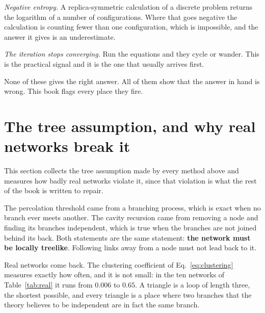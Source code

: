 \emph{Negative entropy.} A replica-symmetric calculation of a discrete problem
returns the logarithm of a number of configurations. Where that goes negative
the calculation is counting fewer than one configuration, which is impossible,
and the answer it gives is an underestimate.

\emph{The iteration stops converging.} Run the equations and they cycle or
wander. This is the practical signal and it is the one that usually arrives
first.

None of these gives the right answer. All of them show that the answer in hand
is wrong. This book flags every place they fire.

\section{The tree assumption, and why real networks break it}
\label{sec:treebreaks}

This section collects the tree assumption made by every method above and
measures how badly real networks violate it, since that violation is what the
rest of the book is written to repair.

The percolation threshold came from a
branching process, which is exact when no branch ever meets another. The cavity
recursion came from removing a node and finding its branches independent, which
is true when the branches are not joined behind its back. Both statements are
the same statement: \textbf{the network must be locally treelike}. Following
links away from a node must not lead back to it.

Real networks come back. The clustering coefficient of
Eq.~\eqref{eq:clustering} measures exactly how often, and it is not small: in
the ten networks of Table~\ref{tab:real} it runs from $0.006$ to $0.65$. A
triangle is a loop of length three, the shortest possible, and every triangle is
a place where two branches that the theory believes to be independent are in
fact the same branch.

